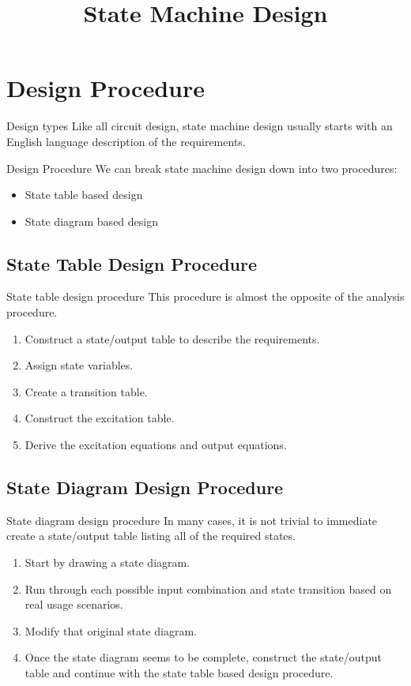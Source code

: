 \title{State Machine Design}

\section{Design Procedure}
\begin{frame}{Design types}
  Like all circuit design, state machine design usually starts with an English language description of the requirements. \\
  \begin{block}{Design Procedure}
    We can break state machine design down into two procedures:
    \begin{itemize}
      \item State table based design
      \item State diagram based design
    \end{itemize}
  \end{block}
\end{frame}

\subsection{State Table Design Procedure}

\begin{frame}{State table design procedure}
  This procedure is almost the opposite of the analysis procedure.
  \begin{enumerate}
    \item Construct a state/output table to describe the requirements.
    \item Assign state variables.
    \item Create a transition table.
    \item Construct the excitation table.
    \item Derive the excitation equations and output equations.
  \end{enumerate}
\end{frame}

\subsection{State Diagram Design Procedure}

\begin{frame}{State diagram design procedure}
    In many cases, it is not trivial to immediate create a state/output table listing all of the required states.
  \begin{enumerate}
    \item Start by drawing a state diagram.
    \item Run through each possible input combination and state transition based on real usage scenarios.
    \item Modify that original state diagram.
    \item Once the state diagram seems to be complete, construct the state/output table and continue with the state table based design procedure.
  \end{enumerate}
\end{frame}

